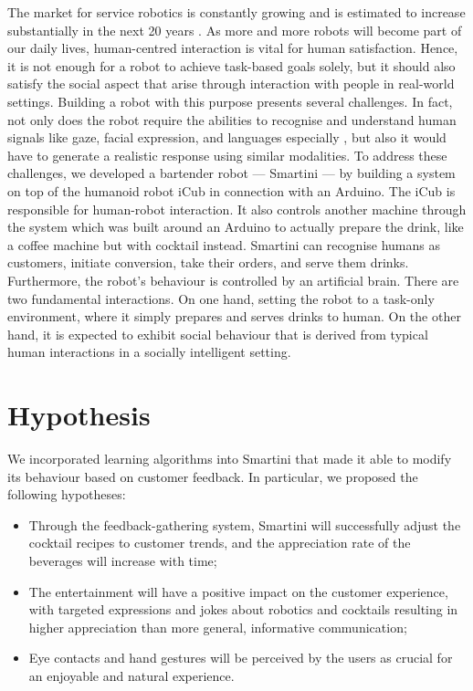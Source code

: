 \documentclass[conference]{IEEEtran}
\begin{document}
	The market for service robotics is constantly growing and is estimated to increase substantially in the next 20 years \cite{stats}\cite{stats2}. As more and more robots will become part of our daily lives, human-centred interaction is vital for human satisfaction. Hence, it is not enough for a robot to achieve task-based goals solely, but it should also satisfy the social aspect that arise through interaction with people in real-world settings. Building a robot with this purpose presents several challenges. In fact, not only does the robot require the abilities to recognise and understand human signals like gaze, facial expression, and languages especially , but also it would have to generate a realistic response using similar modalities. To address these challenges, we developed a bartender robot — Smartini — by building a system on top of the humanoid robot iCub in connection with an Arduino. The iCub is responsible for human-robot interaction. It also controls another machine through the system which was built around an Arduino to actually prepare the drink, like a coffee machine but with cocktail instead. Smartini can recognise humans as customers, initiate conversion, take their orders, and serve them drinks. Furthermore, the robot’s behaviour is controlled by an artificial brain. There are two fundamental interactions. On one hand, setting the robot to a task-only environment, where it simply prepares and serves drinks to human. On the other hand, it is expected to exhibit social behaviour that is derived from typical human interactions in a socially intelligent setting.

\section{Hypothesis}

We incorporated learning algorithms into Smartini that made it able to modify its behaviour based on customer feedback. In particular, we proposed the following hypotheses: 

\begin{itemize}
	\item
	Through the feedback-gathering system, Smartini will successfully adjust the cocktail recipes to customer trends, and the appreciation rate of the beverages will increase with time;
    \item
    The entertainment will have a positive impact on the customer experience, with targeted expressions and jokes about robotics and cocktails resulting in higher appreciation than more general, informative communication;
    \item
    Eye contacts and hand gestures will be perceived by the users as crucial for an enjoyable and natural experience.
    
\end{itemize}
\end{document}
